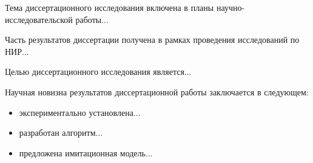 \Characteristic

\CharacteristicLinks
Тема диссертационного исследования включена в планы научно-исследовательской работы...

Часть результатов диссертации получена в рамках проведения исследований по НИР...

\CharacteristicTargets
Целью диссертационного исследования является...

\CharacteristicNovelty
Научная новизна результатов диссертационной работы заключается в следующем:
\begin{itemize}
\item экспериментально установлена...
\item разработан алгоритм...
\item предложена имитационная модель...
\end{itemize}

\CharacteristicIdeas

\CharacteristicContribution

\CharacteristicApprobation

\CharacteristicPublication

\CharacteristicStructure
